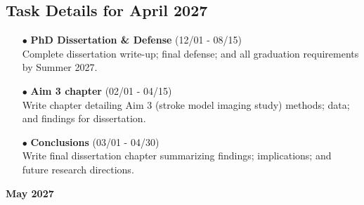 \documentclass[landscape,a4paper]{article}
\begin{document}
\subsection{Task Details for April 2027}
\begin{itemize}[leftmargin=1cm]
    \item[\textcolor{other}{$\bullet$}] \textbf{PhD Dissertation \& Defense} (12/01 - 08/15)\\ Complete dissertation write-up; final defense; and all graduation requirements by Summer 2027.
    \item[\textcolor{other}{$\bullet$}] \textbf{Aim 3 chapter} (02/01 - 04/15)\\ Write chapter detailing Aim 3 (stroke model imaging study) methods; data; and findings for dissertation.
    \item[\textcolor{other}{$\bullet$}] \textbf{Conclusions} (03/01 - 04/30)\\ Write final dissertation chapter summarizing findings; implications; and future research directions.
\end{itemize}

\newpage
\pagestyle{empty}

\begin{center}
{\large\textbf{May 2027}}
\end{center}

\vspace{0.5cm}
\end{document}
